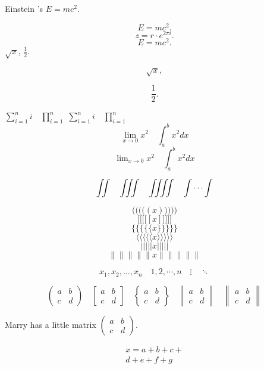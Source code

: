 \documentclass{article}
\begin{document}
Einstein 's $E=mc^2$.

\[ E=mc^2. \]
\[ z = r\cdot e^{2\pi i}. \]
\begin{equation}
E=mc^2.
\end{equation}
$\sqrt{x}$, $\frac{1}{2}$.

\[ \sqrt{x}, \]

\[ \frac{1}{2}. \]

$ \sum_{i=1}^n i\quad \prod_{i=1}^n $
$ \sum\limits _{i=1}^n i\quad \prod\limits _{i=1}^n $
\[ \lim_{x\to0}x^2 \quad \int_a^b x^2 dx \]
\[ \lim\nolimits _{x\to0}x^2\quad \int\nolimits_a^b x^2 dx \]



\[ \iint\quad \iiint\quad \iiiint\quad \idotsint \]



\[ \Bigg(\bigg(\Big(\big((x)\big)\Big)\bigg)\Bigg) \]
\[ \Bigg[\bigg[\Big[\big[[x]\big]\Big]\bigg]\Bigg] \]
\[ \Bigg \{\bigg \{\Big \{\big \{\{x\}\big \}\Big \}\bigg \}\Bigg\} \]
\[ \Bigg\langle\bigg\langle\Big\langle\big\langle\langle x
\rangle\big\rangle\Big\rangle\bigg\rangle\Bigg\rangle \]
\[ \Bigg\lvert\bigg\lvert\Big\lvert\big\lvert\lvert x
\rvert\big\rvert\Big\rvert\bigg\rvert\Bigg\rvert \]
\[ \Bigg\lVert\bigg\lVert\Big\lVert\big\lVert\lVert x
\rVert\big\rVert\Big\rVert\bigg\rVert\Bigg\rVert \]


\[ x_1,x_2,\dots ,x_n\quad 1,2,\cdots ,n\quad
\vdots\quad \ddots \]


\[ \begin{pmatrix} a&b\\c&d \end{pmatrix} \quad
\begin{bmatrix} a&b\\c&d \end{bmatrix} \quad
\begin{Bmatrix} a&b\\c&d \end{Bmatrix} \quad
\begin{vmatrix} a&b\\c&d \end{vmatrix} \quad
\begin{Vmatrix} a&b\\c&d \end{Vmatrix} \]


Marry has a little matrix $ ( \begin{smallmatrix} a&b\\c&d \end{smallmatrix} ) $.


\begin{multline}
x = a+b+c+{} \\
d+e+f+g
\end{multline}
\end{document}
